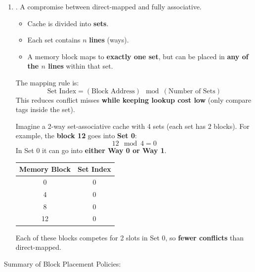 \begin{enumerate}
    \item {}. A compromise between direct-mapped and fully associative.
    \begin{itemize}
        \item Cache is divided into \textbf{sets}.
        \item Each set contains $n$ \textbf{lines} (ways).
        \item A memory block maps to \textbf{exactly one set}, but can be placed in \textbf{any of the $n$ lines} within that set.
    \end{itemize}
    The mapping rule is:
    \begin{equation}
        \text{Set Index} = \left(\text{Block Address}\right) \mod \left(\text{Number of Sets}\right)
    \end{equation}
    This reduces conflict misses \textbf{while keeping lookup cost low} (only compare tags inside the set).

    \begin{examplebox}
        Imagine a 2-way set-associative cache with 4 sets (each set has 2 blocks). For example, the \textbf{block 12} goes into \textbf{Set 0}:
        \begin{equation*}
            12 \mod 4 = 0
        \end{equation*}
        In Set 0 it can go into \textbf{either Way 0 or Way 1}.
        \begin{center}
            \begin{tabular}{@{} c | c @{}}
                \toprule
                Memory Block & Set Index \\
                \midrule
                0   & 0 \\
                4   & 0 \\
                8   & 0 \\
                12  & 0 \\
                \bottomrule
            \end{tabular}
        \end{center}
        Each of these blocks competes for 2 slots in Set 0, so \textbf{fewer conflicts} than direct-mapped.
    \end{examplebox}
\end{enumerate}
Summary of Block Placement Policies:
